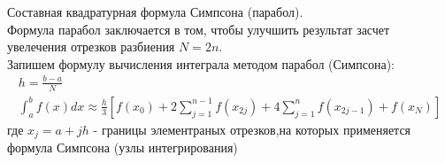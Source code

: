 \documentclass[__main__.tex]{subfiles}
\begin{document}
	Составная квадратурная формула Симпсона (парабол).\\

	Формула парабол заключается в том, чтобы улучшить результат засчет увелечения отрезков разбиения $N = 2n$.\\
	Запишем формулу вычисления интеграла методом парабол (Симпсона):
	\begin{gather*}
	h = \frac{b-a}{N}\\
	\int_a^b f(x)dx \approx \frac{h}{3}\left[f(x_0)+2\sum_{j=1}^{n-1}f(x_{2j})+4\sum_{j=1}^{n}f(x_{2j-1})+f(x_N)\right]
	\end{gather*}
	где $x_j = a+jh$ - границы элементраных отрезков,на которых применяется формула Симпсона (узлы интегрирования)
\end{document}
